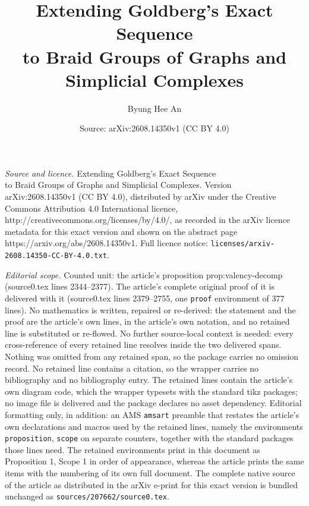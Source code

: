 \documentclass[10pt,a4paper]{amsart}
\title{Extending Goldberg's Exact Sequence \\ to Braid Groups of Graphs and Simplicial Complexes}
\author{Byung Hee An}
\date{Source: arXiv:2608.14350v1 (CC BY 4.0)}
\begin{document}
\maketitle

\noindent\emph{Source and licence.} Extending Goldberg's Exact Sequence \\ to Braid Groups of Graphs and Simplicial Complexes. Version arXiv:2608.14350v1 (CC BY 4.0), distributed by arXiv under the Creative Commons Attribution 4.0 International licence, http://creativecommons.org/licenses/by/4.0/, as recorded in the arXiv licence metadata for this exact version and shown on the abstract page https://arxiv.org/abs/2608.14350v1. Full licence notice: \texttt{licenses/arxiv-2608.14350-CC-BY-4.0.txt}.\par\smallskip

\noindent\textit{Editorial scope.} Counted unit: the article's proposition prop:valency-decomp (source0.tex lines 2344--2377). The article's complete original proof of it is delivered with it (source0.tex lines 2379--2755, one \texttt{proof} environment of 377 lines). No mathematics is written, repaired or re-derived: the statement and the proof are the article's own lines, in the article's own notation, and no retained line is substituted or re-flowed.  No further source-local context is needed: every cross-reference of every retained line resolves inside the two delivered spans.  Nothing was omitted from any retained span, so the package carries no omission record.  No retained line contains a citation, so the wrapper carries no bibliography and no bibliography entry.  The retained lines contain the article's own diagram code, which the wrapper typesets with the standard tikz packages; no image file is delivered and the package declares no asset dependency.  Editorial formatting only, in addition: an AMS \texttt{amsart} preamble that restates the article's own declarations and macros used by the retained lines, namely the environments \texttt{proposition}, \texttt{scope} on separate counters, together with the standard packages those lines need.  The retained environments print in this document as Proposition 1, Scope 1 in order of appearance, whereas the article prints the same items with the numbering of its own full document.  The complete native source of the article as distributed in the arXiv e-print for this exact version is bundled unchanged as \texttt{sources/207662/source0.tex}.
\end{document}
